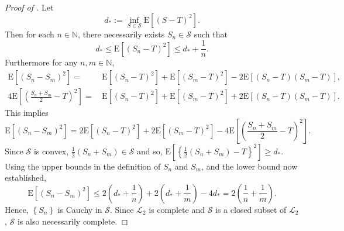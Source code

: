 \documentclass[12pt]{article}
\numberwithin{equation}{section}
\theoremstyle{definition}
\theoremstyle{plain}
\begin{document}
\begin{proof}[Proof of ]
Let
\begin{equation*}
  d_{\ast} := \inf_{S \in \mathcal{S}} \mathrm{E} \left[ (S - T)^{2} \right].
\end{equation*}
Then for each \(n \in \mathbb{N}\), there necessarily exists \(S_{n} \in
\mathcal{S}\) such that
\begin{equation*}
  d_{\ast} \leq \mathrm{E} \left[ \left( S_{n} - T \right)^{2} \right] \leq
  d_{\ast} + \frac{1}{n}.
\end{equation*}
Furthermore for any \(n, m \in \mathbb{N}\),
\begin{align*}
  \mathrm{E} \left[ \left( S_{n} - S_{m} \right)^{2} \right] =
  & \, \mathrm{E} \left[ \left( S_{n} - T \right)^{2} \right] + \mathrm{E}
  \left[ \left( S_{m} - T \right)^{2} \right] - 2 \mathrm{E} \left[ \left( S_{n}
  - T \right) \left( S_{m} - T \right) \right], \\
  4 \mathrm{E} \left[ \left( \frac{S_{n} + S_{m}}{2} - T \right)^{2} \right] =
  & \, \mathrm{E} \left[ \left( S_{n} - T \right)^{2} \right] + \mathrm{E}
  \left[ \left( S_{m} - T \right)^{2} \right] + 2 \mathrm{E} \left[ \left( S_{n}
  - T \right) \left( S_{m} - T \right) \right].
\end{align*}
This implies
\begin{equation*}
  \mathrm{E} \left[ \left( S_{n} - S_{m} \right)^{2} \right] =
  2 \mathrm{E} \left[ \left( S_{n} - T \right)^{2} \right] + 2 \mathrm{E}
  \left[ \left( S_{m} - T \right)^{2} \right] - 4 \mathrm{E} \left[ \left(
  \frac{S_{n} + S_{m}}{2} - T \right)^{2} \right].
\end{equation*}
Since \(\mathcal{S}\) is convex, \(\frac{1}{2} \left( S_{n} + S_{m} \right) \in
\mathcal{S}\) and so, \(\mathrm{E} \left[ \left\{ \frac{1}{2} \left( S_{n} +
S_{m} \right) - T \right\}^{2} \right] \geq d_{\ast}\).
Using the upper bounds in the definition of \(S_{n}\) and \(S_{m}\), and the
lower bound now established,
\begin{equation*}
  \mathrm{E} \left[ \left( S_{n} - S_{m} \right)^{2} \right] \leq
  2 \left( d_{\ast} + \frac{1}{n} \right) + 2 \left( d_{\ast} + \frac{1}{m}
  \right) - 4 d_{\ast} = 2 \left( \frac{1}{n} + \frac{1}{m} \right).
\end{equation*}
Hence, \(\left\{ S_{n} \right\}\) is Cauchy in \(\mathcal{S}\).
Since \(\mathscr{L}_{2}\) is complete and \(\mathcal{S}\) is a closed subset of
\(\mathscr{L}_{2}\), \(\mathcal{S}\) is also necessarily complete.

\end{proof}
\end{document}
